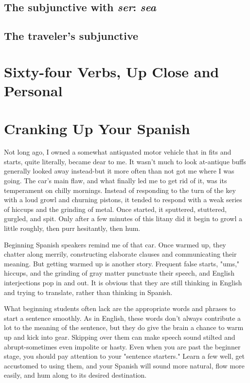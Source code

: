 \section{The subjunctive with \textit{ser}: \textit{sea}}
\section{The traveler's subjunctive}

\chapter{Sixty-four Verbs, Up Close and Personal}

\chapter{Cranking Up Your Spanish}

Not long ago, I owned a somewhat antiquated motor vehicle
that in fits and starts, quite literally, became dear to me. It wasn't
much to look at-antique buffs generally looked away instead-but
it more often than not got me where I was going. The car's main flaw,
and what finally led me to get rid of it, was its temperament on chilly
mornings. Instead of responding to the turn of the key with a loud
growl and churning pistons, it tended to respond with a weak series of
hiccups and the grinding of metal. Once started, it sputtered, stuttered,
gurgled, and spit. Only after a few minutes of this litany did it begin to
growl a little roughly, then purr hesitantly, then hum.

Beginning Spanish speakers remind me of that car. Once
warmed up, they chatter along merrily, constructing elaborate clauses
and communicating their meaning. But getting warmed up is another
story. Frequent false starts, "ums," hiccups, and the grinding of gray
matter punctuate their speech, and English interjections pop in and
out. It is obvious that they are still thinking in English and trying to
translate, rather than thinking in Spanish.

What beginning students often lack are the appropriate words
and phrases to start a sentence smoothly. As in English, these words
don't always contribute a lot to the meaning of the sentence, but they
do give the brain a chance to warm up and kick into gear. Skipping
over them can make speech sound stilted and abrupt-sometimes
even impolite or hasty. Even when you are past the beginner stage, you
should pay attention to your "sentence starters." Learn a few well, get
accustomed to using them, and your Spanish will sound more natural,
flow more easily, and hum along to its desired destination.

